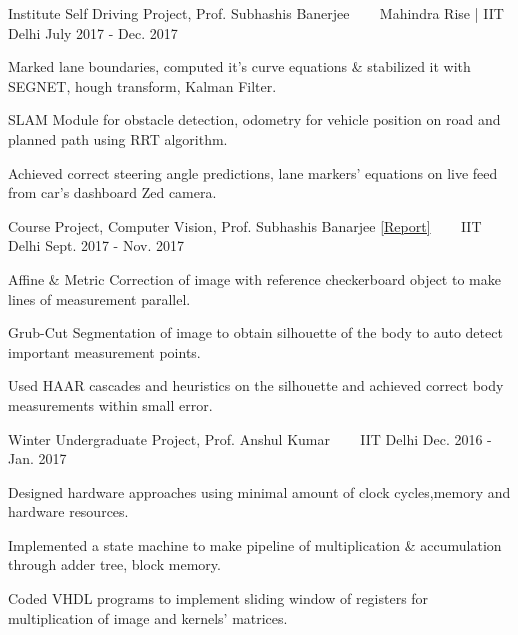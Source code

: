 \begin{cventries}
  \cventry
  {Institute Self Driving Project, Prof. Subhashis Banerjee}
  {\href{https://github.com/AniketBajpai/AutoNav2}{}
    \ \ \ \normalfont\href{https://github.com/AniketBajpai/AutoNav2}
    {}}
  {Mahindra Rise | IIT Delhi}
  {July 2017 - Dec. 2017}
  {
    \begin{cvitems}
    \item Marked lane boundaries, computed it's curve equations \& stabilized it with SEGNET, hough transform, Kalman Filter.
    \item SLAM Module for obstacle detection, odometry for         vehicle position on road and planned path using RRT         algorithm.
    \item Achieved correct steering angle predictions, lane markers' equations on live feed from car's dashboard Zed camera.
    \end{cvitems}
  }
  
  \cventry
  {Course Project, Computer Vision, Prof. Subhashis Banarjee
  \href {https://github.com/ankesh007/Body-Measurement-using-Computer-Vision/blob/master/Presentation.pdf} {[Report]}}
  {\href{https://github.com/ankesh007/Body-Measurement-using-Computer-Vision}{}
    \ \ \ \normalfont\href{https://github.com/ankesh007/Body-Measurement-using-Computer-Vision}
    {}}
  {IIT Delhi}
  {Sept. 2017 - Nov. 2017}
  {
    \begin{cvitems}
    \item Affine \& Metric Correction of image with reference checkerboard object to make lines of measurement parallel.
    \item Grub-Cut Segmentation of image to obtain silhouette of the body to auto detect important measurement points.
    \item Used HAAR cascades and heuristics on the silhouette and achieved correct body measurements within small error.
    \end{cvitems}
  }


 \cventry
  {Winter Undergraduate Project, Prof. Anshul Kumar}
  {\href{https://drive.google.com/file/d/0B7I8cEc5HGiaaDZNNnJESV94T3FiaFp6elZBZEk5Wm9Ub19z/view?usp=sharing}{}
    \ \ \ \normalfont\href{https://drive.google.com/file/d/0B7I8cEc5HGiaaDZNNnJESV94T3FiaFp6elZBZEk5Wm9Ub19z/view?usp=sharing}
    {}}
  {IIT Delhi}
  {Dec. 2016 - Jan. 2017}
  {
    \begin{cvitems}
    \item Designed hardware approaches using minimal amount of clock cycles,memory and hardware resources.
    \item Implemented a state machine to make pipeline of multiplication \& accumulation through adder tree, block memory.
    \item Coded VHDL programs to implement sliding window of registers for multiplication of image and kernels' matrices.
    \end{cvitems}
  }

\end{cventries}


